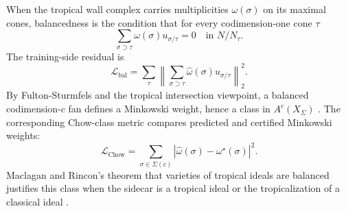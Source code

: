 \documentclass[11pt]{article}
\theoremstyle{definition}
\theoremstyle{plain}
\theoremstyle{remark}
\numberwithin{equation}{section}
\newcommand{\abs}[1]{\left\lvert #1\right\rvert}
\begin{document}
When the tropical wall complex carries multiplicities $\omega(\sigma)$ on its maximal cones, balancedness is the condition that for every codimension-one cone $\tau$
\begin{equation}
  \sum_{\sigma\supset\tau}\omega(\sigma)u_{\sigma/\tau}=0
  \quad\text{in }N/N_\tau.
\end{equation}
The training-side residual is
\begin{equation}
  \mathcal L_{\mathrm{bal}}
  =
  \sum_{\tau}
  \left\|
    \sum_{\sigma\supset\tau}\widehat\omega(\sigma)u_{\sigma/\tau}
  \right\|_2^2.
\end{equation}
By Fulton-Sturmfels and the tropical intersection viewpoint, a balanced codimension-$c$ fan defines a Minkowski weight, hence a class in $A^c(X_\Sigma)$ \cite{fultonsturmfels1994intersection,katz2009tropicalintersection}.  The corresponding Chow-class metric compares predicted and certified Minkowski weights:
\begin{equation}
  \mathcal L_{\mathrm{Chow}}
  =
  \sum_{\sigma\in\Sigma(c)}
  \abs{\widehat\omega(\sigma)-\omega^\star(\sigma)}^2.
\end{equation}
Maclagan and Rincon's theorem that varieties of tropical ideals are balanced justifies this class when the sidecar is a tropical ideal or the tropicalization of a classical ideal \cite{maclaganrincon2018tropicalideals,maclaganrincon2020balanced}.
\end{document}
